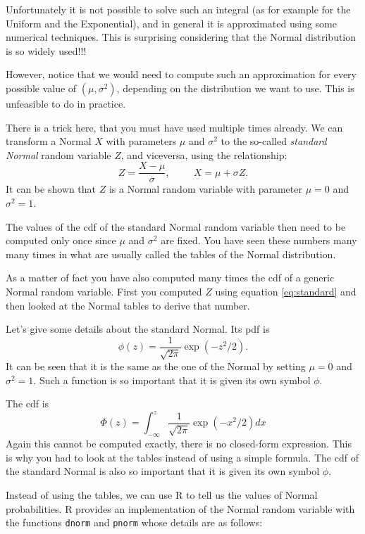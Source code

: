 \documentclass[
]{book}
\begin{document}
Unfortunately it is not possible to solve such an integral (as for example for the Uniform and the Exponential), and in general it is approximated using some numerical techniques. This is surprising considering that the Normal distribution is so widely used!!!

However, notice that we would need to compute such an approximation for every possible value of \((\mu,\sigma^2)\), depending on the distribution we want to use. This is unfeasible to do in practice.

There is a trick here, that you must have used multiple times already. We can transform a Normal \(X\) with parameters \(\mu\) and \(\sigma^2\) to the so-called \emph{standard Normal} random variable \(Z\), and viceversa, using the relationship:
\begin{equation}
 \label{eq:standard}
Z = \frac{X-\mu}{\sigma}, \hspace{1cm} X= \mu + \sigma Z.
\end{equation}
It can be shown that \(Z\) is a Normal random variable with parameter \(\mu=0\) and \(\sigma^2=1\).

The values of the cdf of the standard Normal random variable then need to be computed only once since \(\mu\) and \(\sigma^2\) are fixed. You have seen these numbers many many times in what are usually called the tables of the Normal distribution.

As a matter of fact you have also computed many times the cdf of a generic Normal random variable. First you computed \(Z\) using equation \eqref{eq:standard} and then looked at the Normal tables to derive that number.

Let's give some details about the standard Normal. Its pdf is
\[
\phi(z)=\frac{1}{\sqrt{2\pi}}\exp\left(-z^2/2\right).
\]
It can be seen that it is the same as the one of the Normal by setting \(\mu=0\) and \(\sigma^2=1\). Such a function is so important that it is given its own symbol \(\phi\).

The cdf is
\[
\Phi(z)=\int_{-\infty}^z\frac{1}{\sqrt{2\pi}}\exp\left(-x^2/2\right)dx
\]
Again this cannot be computed exactly, there is no closed-form expression. This is why you had to look at the tables instead of using a simple formula. The cdf of the standard Normal is also so important that it is given its own symbol \(\phi\).

Instead of using the tables, we can use R to tell us the values of Normal probabilities. R provides an implementation of the Normal random variable with the functions \texttt{dnorm} and \texttt{pnorm} whose details are as follows:
\end{document}
